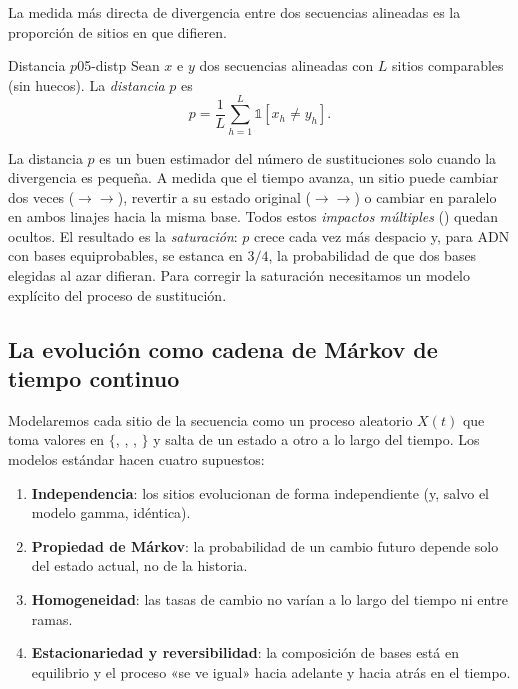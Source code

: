 La medida más directa de divergencia entre dos secuencias alineadas es la proporción de sitios en que difieren.

\begin{definicion}{Distancia $p$}{05-distp}
Sean $x$ e $y$ dos secuencias alineadas con $L$ sitios comparables (sin huecos). La \emph{distancia} $p$ es
\begin{equation}\label{eq:05-p}
p = \frac{1}{L}\sum_{h=1}^{L}\mathbb{1}\left[x_h\neq y_h\right].
\end{equation}
\end{definicion}

\begin{simbolos}
\end{simbolos}

La distancia $p$ es un buen estimador del número de sustituciones solo cuando la divergencia es pequeña. A medida que el tiempo avanza, un sitio puede cambiar dos veces ($\to$$\to$), revertir a su estado original ($\to$$\to$) o cambiar en paralelo en ambos linajes hacia la misma base. Todos estos \emph{impactos múltiples} () quedan ocultos. El resultado es la \emph{saturación}: $p$ crece cada vez más despacio y, para ADN con bases equiprobables, se estanca en $3/4$, la probabilidad de que dos bases elegidas al azar difieran. Para corregir la saturación necesitamos un modelo explícito del proceso de sustitución.

\subsection{La evolución como cadena de Márkov de tiempo continuo}

Modelaremos cada sitio de la secuencia como un proceso aleatorio $X(t)$ que toma valores en $\{$, , , $\}$ y salta de un estado a otro a lo largo del tiempo. Los modelos estándar hacen cuatro supuestos:
\begin{enumerate}
  \item \textbf{Independencia}: los sitios evolucionan de forma independiente (y, salvo el modelo gamma, idéntica).
  \item \textbf{Propiedad de Márkov}: la probabilidad de un cambio futuro depende solo del estado actual, no de la historia.
  \item \textbf{Homogeneidad}: las tasas de cambio no varían a lo largo del tiempo ni entre ramas.
  \item \textbf{Estacionariedad y reversibilidad}: la composición de bases está en equilibrio y el proceso «se ve igual» hacia adelante y hacia atrás en el tiempo.
\end{enumerate}


